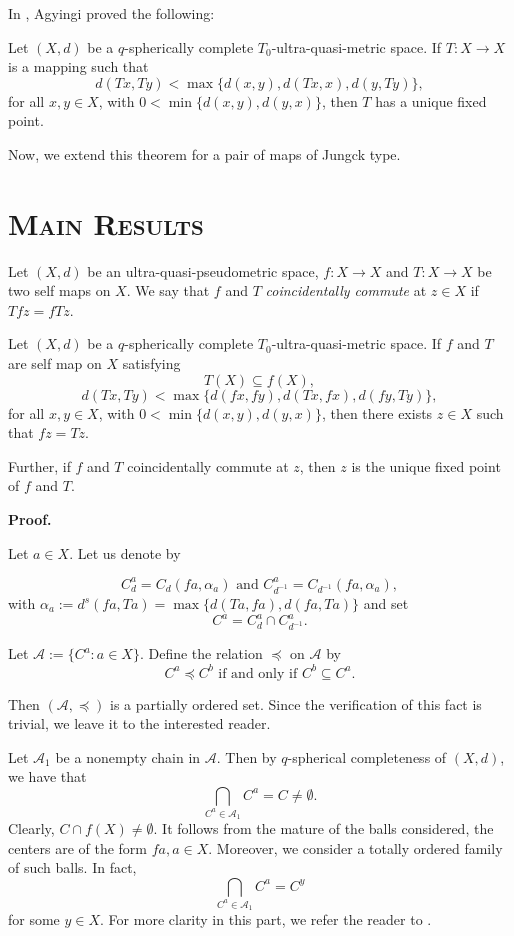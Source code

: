 \documentclass[10pt,a4paper]{article}
\begin{document}
{In \cite{Agyingifixed}, Agyingi proved the following:

\theorem Let $(X,d)$ be a $q$-spherically complete $T_0$-ultra-quasi-metric space. If $T:X\to X$ is a mapping such that 
$$ d(Tx,Ty)< \max\{ d(x,y),d(Tx,x),d(y,Ty)\} ,$$
for all $x,y\in X$, with $0<\min\{d(x,y),d(y,x)\}$, then $T$ has a unique fixed point.

Now, we extend this theorem for a pair of maps of Jungck type.
\section{\textsc{Main Results}}
 Let $(X,d)$ be an ultra-quasi-pseudometric space, $f:X\to X$ and $T:X\to X$ be two self maps on $X$. We say that $f$ and $T$ {\em coincidentally commute} at $z\in X$ if $Tfz=fTz$.

\theorem\label{mainresult}  Let $(X,d)$ be a $q$-spherically complete $T_0$-ultra-quasi-metric space. If $f$ and $T$ are self map on $X$ satisfying 
\begin{equation}
T(X)\subseteq f(X),
\end{equation}
\begin{equation}\label{2}
d(Tx,Ty)< \max\{ d(fx,fy),d(Tx,fx),d(fy,Ty)\} ,
\end{equation}
for all $x,y\in X$, with $0<\min\{d(x,y),d(y,x)\}$, then there exists $z\in X$ such that $fz=Tz$. 

Further, if $f$ and $T$ coincidentally commute at $z$, then $z$ is the unique fixed point of $f$ and $T$.

{\bf Proof.}

Let $a\in X$. Let us denote by 

$$ C_d^a = C_{d}(fa,\alpha_a) \text{ and }    C_{d^{-1}}^a= C_{d^{-1}}(fa,\alpha_a)                                   ,$$
with $\alpha_a:= d^s(fa,Ta)=\max\{d(Ta,fa),d(fa,Ta)\}$ and set 
$$C^a = C_d^a \cap  C_{d^{-1}}^a .$$

Let $\mathcal{A}:=\lbrace C^a: a\in X \rbrace$. Define the relation $\preceq$ on $\mathcal{A}$ by 
   $$ C^a \preceq C^b \text{ if and only if }  C^b \subseteq C^a .$$
   
  Then $(\mathcal{A},\preceq)$ is a partially ordered set. Since the verification of this fact is trivial, we leave it to the interested reader.

Let $\mathcal{A}_1$ be a nonempty chain in $\mathcal{A}$. Then by $q$-spherical completeness of $(X,d)$, we have that \[ \bigcap_{C^a\in \mathcal{A}_1}C^a=C\neq \emptyset.\]
Clearly, $C\cap f(X) \neq \emptyset$. It follows from the mature of the balls considered, the centers are of the form $fa, a\in X$. Moreover, we consider a totally ordered family of such balls. In fact, 
 \[ \underset{C^a \in \mathscr{A}_1}{\bigcap}C^a=C^y \] for some $y\in X$. For more clarity in this part, we refer the reader to \cite{Rao}.
 
}
\end{document}
